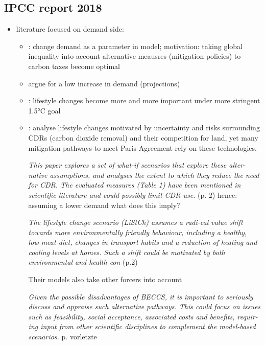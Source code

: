 \subsection{IPCC report 2018 \citep{Rogelj2018MitigationDevelopment.}}
\begin{itemize}
\item literature focused on demand side: 
\begin{itemize}
	\item 
	\cite{Bertram2018TargetedScenarios}:   change demand as a parameter in  model; motivation: taking global inequality into account alternative meausres (mitigation policies) to carbon taxes  become optimal
	\item \cite{Grubler2018ATechnologies} argue for a low increase in demand (projections)
	\item \cite{Liu2018SocioeconomicC}: lifestyle changes become more and more important under more stringent 1.5°C goal 
	\item \cite{VanVuuren2018AlternativeTechnologies}: analyse lifestyle changes motivated by uncertainty and risks surrounding CDRs (carbon dioxide removal) and their competition for land, yet many mitigation pathways to meet Paris Agreement rely on these technologies.
	
	\textit{This paper  explores  a  set  of  what-if  scenarios  that  explore  these  alter-native  assumptions,  and  analyses  the  extent  to  which  they  reduce  the  need  for  CDR.  The  evaluated  measures  (Table  1)  have  been  mentioned in scientific literature and could possibly limit CDR use. } (p. 2) \ar hence: assuming a lower demand what does this imply?
	
	\textit{The  lifestyle  change  scenario  (LiStCh)  assumes  a  radi-cal  value  shift  towards  more  environmentally  friendly  behaviour,  including a healthy, low-meat diet, changes in transport habits and a reduction of heating and cooling levels at homes. Such a shift could be motivated by both environmental and health con} (p.2)
	
	Their models also take other forcers into account 
	
	\textit{ Given  the  possible  disadvantages  of  BECCS,  it  is  important  to  seriously  discuss  and  appraise such alternative pathways. This could focus on issues such as feasibility, social acceptance, associated costs and benefits, requir-ing input from other scientific disciplines to complement the model-based  scenarios. } p. vorletzte
	

\end{itemize}
\end{itemize}
